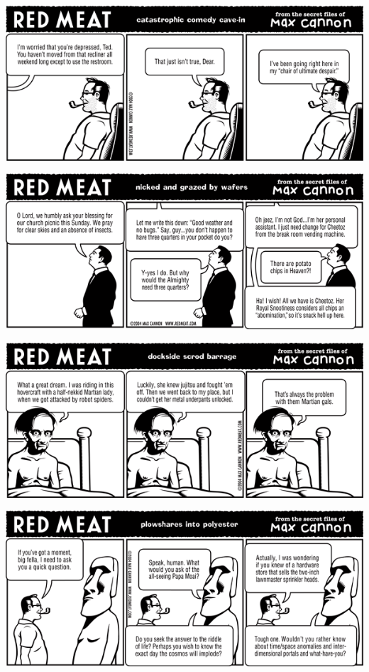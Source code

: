 \documentclass[a4paper,twoside,11pt]{article}
\begin{document}
\includegraphics[width=\textwidth]{redmeat_2004-06-08.png}



\includegraphics[width=\textwidth]{redmeat_2004-06-15.png}



\includegraphics[width=\textwidth]{redmeat_2004-06-22.png}



\includegraphics[width=\textwidth]{redmeat_2004-06-29.png}
\end{document}
